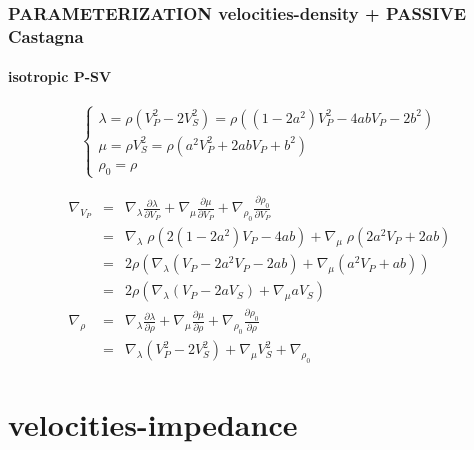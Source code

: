 \documentclass[9pt]{beamer}
\newcommand{\partderi}[2]{\frac{\partial#1}{\partial#2}}
\begin{document}
\begin{frame}\frametitle{PARAMETERIZATION velocities-density + PASSIVE Castagna}
\framesubtitle{isotropic P-SV}

  \begin{center}
  \end{center}
  
  \begin{minipage}{\linewidth}
    \[\left\{ \begin{array}{l}
      \lambda = \rho (V_P^2-2V_S^2) = \rho\left( (1-2a^2)V_P^2 -4abV_P -2b^2\right) \\
      \mu    = \rho V_S^2 = \rho( a^2V_P^2 +2abV_P +b^2 ) \\
      \rho_0 = \rho
    \end{array} \right.\]
    
    \begin{eqnarray}
      \nabla_{V_P} &=& \nabla_\lambda \partderi{\lambda}{V_P} + \nabla_\mu \partderi{\mu}{V_P} + \nabla_{\rho_0} \partderi{\rho_0}{V_P} \nonumber\\
                   &=& \nabla_\lambda \;\rho \left( 2(1-2a^2)V_P - 4ab\right) + \nabla_\mu \;\rho (2a^2V_P+2ab) \nonumber\\
                   &=& 2\rho\left( \nabla_\lambda  \left( V_P-2a^2V_P - 2ab\right) + \nabla_\mu  (a^2V_P+ab) \right) \nonumber\\
                   &=& 2\rho\left( \nabla_\lambda  (V_P-2aV_S) + \nabla_\mu aV_S \right) \nonumber\\
      \nabla_\rho  &=& \nabla_\lambda \partderi{\lambda}{\rho} + \nabla_\mu \partderi{\mu}{\rho} + \nabla_{\rho_0} \partderi{\rho_0}{\rho} \nonumber\\
                   &=& \nabla_\lambda (V_P^2-2V_S^2) + \nabla_\mu V_S^2 + \nabla_{\rho_0} \nonumber
    \end{eqnarray}

  \end{minipage}
  
\end{frame}


\section{velocities-impedance}
\end{document}
